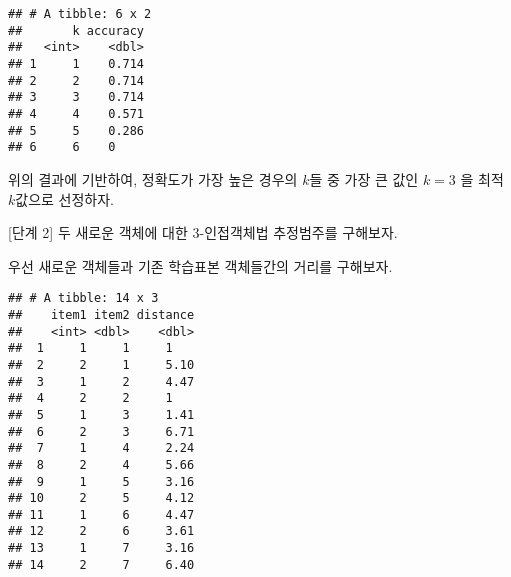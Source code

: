 \documentclass[]{book}
\newenvironment{Shaded}{\begin{snugshade}}{\end{snugshade}}
\newcommand{\DataTypeTok}[1]{\textcolor[rgb]{0.13,0.29,0.53}{#1}}
\newcommand{\DecValTok}[1]{\textcolor[rgb]{0.00,0.00,0.81}{#1}}
\newcommand{\KeywordTok}[1]{\textcolor[rgb]{0.13,0.29,0.53}{\textbf{#1}}}
\newcommand{\NormalTok}[1]{#1}
\newcommand{\OperatorTok}[1]{\textcolor[rgb]{0.81,0.36,0.00}{\textbf{#1}}}
\newcommand{\StringTok}[1]{\textcolor[rgb]{0.31,0.60,0.02}{#1}}
\begin{document}
\begin{verbatim}
## # A tibble: 6 x 2
##       k accuracy
##   <int>    <dbl>
## 1     1    0.714
## 2     2    0.714
## 3     3    0.714
## 4     4    0.571
## 5     5    0.286
## 6     6    0
\end{verbatim}

위의 결과에 기반하여, 정확도가 가장 높은 경우의 \(k\)들 중 가장 큰 값인 \(k = 3\) 을 최적 \(k\)값으로 선정하자.

{[}단계 2{]} 두 새로운 객체에 대한 3-인접객체법 추정범주를 구해보자.

우선 새로운 객체들과 기존 학습표본 객체들간의 거리를 구해보자.

\begin{Shaded}
\end{Shaded}

\begin{verbatim}
## # A tibble: 14 x 3
##    item1 item2 distance
##    <int> <dbl>    <dbl>
##  1     1     1     1   
##  2     2     1     5.10
##  3     1     2     4.47
##  4     2     2     1   
##  5     1     3     1.41
##  6     2     3     6.71
##  7     1     4     2.24
##  8     2     4     5.66
##  9     1     5     3.16
## 10     2     5     4.12
## 11     1     6     4.47
## 12     2     6     3.61
## 13     1     7     3.16
## 14     2     7     6.40
\end{verbatim}
\end{document}
